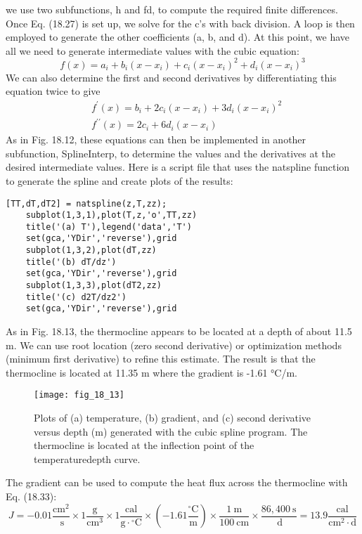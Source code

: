 \documentclass[../main.tex]{subfiles}
\begin{document}
we use two subfunctions, h and fd, to compute the required finite differences. Once
Eq. (18.27) is set up, we solve for the c's with back division. A loop is then employed to
generate the other coefficients (a, b, and d).
At this point, we have all we need to generate intermediate values with the cubic
equation:
$$
f(x)=a_{i}+b_{i}\left(x-x_{i}\right)+c_{i}\left(x-x_{i}\right)^{2}+d_{i}\left(x-x_{i}\right)^{3}
$$
We can also determine the first and second derivatives by differentiating this equation twice to give
$$
\begin{aligned}
&f^{\prime}(x)=b_{i}+2 c_{i}\left(x-x_{i}\right)+3 d_{i}\left(x-x_{i}\right)^{2} \\
&f^{\prime \prime}(x)=2 c_{i}+6 d_{i}\left(x-x_{i}\right)
\end{aligned}
$$
As in Fig. 18.12, these equations can then be implemented in another subfunction,
SplineInterp, to determine the values and the derivatives at the desired intermediate
values.
Here is a script file that uses the natspline function to generate the spline and create
plots of the results: 

\begin{lstlisting}[numbers=none]
    [TT,dT,dT2] = natspline(z,T,zz);
    subplot(1,3,1),plot(T,z,'o',TT,zz)
    title('(a) T'),legend('data','T')
    set(gca,'YDir','reverse'),grid
    subplot(1,3,2),plot(dT,zz)
    title('(b) dT/dz')
    set(gca,'YDir','reverse'),grid
    subplot(1,3,3),plot(dT2,zz)
    title('(c) d2T/dz2')
    set(gca,'YDir','reverse'),grid
\end{lstlisting}

As in Fig. 18.13, the thermocline appears to be located at a depth of about 11.5 m. We
can use root location (zero second derivative) or optimization methods (minimum first
derivative) to refine this estimate. The result is that the thermocline is located at 11.35 m
where the gradient is -1.61 °C/m.

\begin{figure}[H]
    \centering
    \texttt{[image: fig\_18\_13]}
   \caption{\textsf{Plots of (a) temperature, (b) gradient, and (c) second derivative versus depth (m) generated with
   the cubic spline program. The thermocline is located at the inflection point of the temperaturedepth curve.}}\label{fig:fig_18_13}
\end{figure}

The gradient can be used to compute the heat flux across the thermocline with
Eq. (18.33):
\begin{equation}
    \nonumber
    J=-0.01 \frac{\mathrm{cm}^{2}}{\mathrm{~s}} \times 1 \frac{\mathrm{g}}{\mathrm{cm}^{3}} \times 1 \frac{\mathrm{cal}}{\mathrm{g} \cdot{ }^{\circ} \mathrm{C}} \times\left(-1.61 \frac{{ }^{\circ} \mathrm{C}}{\mathrm{m}}\right) \times \frac{1 \mathrm{~m}}{100 \mathrm{~cm}} \times \frac{86,400 \mathrm{~s}}{\mathrm{~d}}=13.9 \frac{\mathrm{cal}}{\mathrm{cm}^{2} \cdot \mathrm{d}}
    \end{equation}
\end{document}
